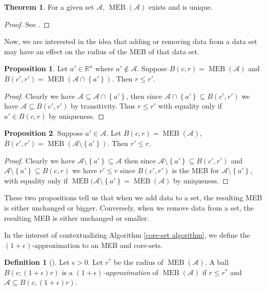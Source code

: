 \documentclass[11pt,twoside]{report}
\newcommand{\A}{\mathcal{A}} %
\DeclareMathOperator{\MEB}{MEB}
\theoremstyle{definition}
\newtheorem{definition}{Definition}
\newtheorem{theorem}{Theorem}
\newtheorem{proposition}{Proposition}
\numberwithin{theorem}{section}
\numberwithin{definition}{section}
\numberwithin{lemma}{section}
\numberwithin{proposition}{section}
\numberwithin{equation}{section}
\numberwithin{figure}{section}
\begin{document}
\begin{theorem}\label{thm:unique}
    For a given set $\A$, $\MEB(\A)$ exists and is unique.
\end{theorem}
\begin{proof}
    See \cite[page 5]{two-algorithms}.
\end{proof}

Now, we are interested in the idea that adding or removing data from a data set may have an effect on the radius of the MEB of that data set.
\begin{proposition}\label{adding data}
    Let $a'\in\mathbb{R}^n$ where $a'\notin\A$. Suppose $B(c,r)=\MEB(\A)$ and $B(c',r')=\MEB(\A\cap\left\{a'\right\})$. Then $r\leq r'$.
\end{proposition}
\begin{proof}
    Clearly we have $\A\subseteq\A\cap\left\{a'\right\}$, then since $\A\cap\left\{a'\right\}\subseteq B(c',r')$ we have $\mathcal{A}\subseteq B(c',r')$ by transitivity. Thus $r\leq r'$ with equality only if $a'\in B(c,r)$ by uniqueness.
\end{proof}

\begin{proposition}\label{removing data}
    Suppose $a'\in\A$. Let $B(c,r)=\MEB(\A)$, $B(c',r')=\MEB(\A\setminus\left\{a'\right\})$. Then $r'\leq r$.
\end{proposition}
\begin{proof}
    Clearly we have $\A\setminus\left\{a'\right\}\subseteq\A$ then since $\A\setminus\left\{a'\right\}\subseteq B(c',r')$ and $\A\setminus\left\{a'\right\}\subseteq B(c,r)$ we have $r'\leq r$ since $B(c',r')$ is the MEB for $\A\setminus\left\{a'\right\}$, with equality only if $\MEB(\A\setminus\left\{a'\right\} = \MEB(\A)$ by uniqueness.
\end{proof}
These two propositions tell us that when we add data to a set, the resulting MEB is either unchanged or bigger. Conversely, when we remove data from a set, the resulting MEB is either unchanged or smaller.

In the interest of contextualizing Algorithm \ref{core-set algorithm}, we define the $(1+\epsilon)$-approximation to an MEB and core-sets.
\begin{definition}[{{\cite[page 2]{core-sets}}}]
    Let $\epsilon>0$. Let $r^*$ be the radius of $\MEB(\A)$. A ball $B(c;(1+\epsilon)r)$ is a \textit{$(1+\epsilon)$-approximation} of $\MEB(\A)$ if $r\leq r^*$ and $\mathcal{A}\subseteq B(c,(1+\epsilon)r)$.
\end{definition}
\end{document}
